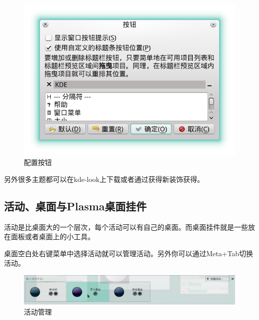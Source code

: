 \documentclass[11pt,openany]{book}
\begin{document}
\begin{figure}[htbp]
 \centering
 \includegraphics{./pic/botton.png}
 \caption{配置按钮}\label{botton}
\end{figure}
另外很多主题都可以在kde-look上下载或者通过获得新装饰获得。
\subsection{活动、桌面与Plasma桌面挂件}
活动是比桌面大的一个层次，每个活动可以有自己的桌面。而桌面挂件就是一些放在面板或者桌面上的小工具。

桌面空白处右键菜单中选择活动就可以管理活动。另外你可以通过Meta+Tab切换活动。
\begin{figure}[htb]
\centering
\includegraphics[width=\textwidth]{./pic/activity.png} 
\caption{活动管理}\label{activity}
\end{figure}
\end{document}
